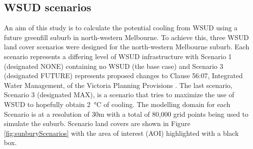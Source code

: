 \documentclass[final,3p,times,authoryear]{elsarticle}
\begin{document}




\subsection{WSUD scenarios}\label{sec:methods_wsudscenarios}
An aim of this study is to calculate the potential cooling from WSUD using a future greenfill suburb in north-western Melbourne. To achieve this, three WSUD land cover scenarios were designed for the north-western Melbourne suburb. Each scenario represents a differing level of WSUD infrastructure with Scenario 1 (designated NONE) containing no WSUD (the base case) and Scenario 3 (designated FUTURE) represents proposed changes to Clause 56:07, Integrated Water Management, of the Victoria Planning Provisions \citep{VictoriaStateGovernment2018}. The last scenario, Scenario 3 (designated MAX), is a scenario that tries to maximize the use of WSUD to hopefully obtain 2\SI{}{\degreeCelsius} of cooling. The modelling domain for each Scenario is at a resolution of 30m with a total of 80,000 grid points being used to simulate the suburb. Scenario land covers are shown in Figure \ref{fig:sunburyScenarios} with the area of interest (AOI) highlighted with a black box. 
\end{document}
